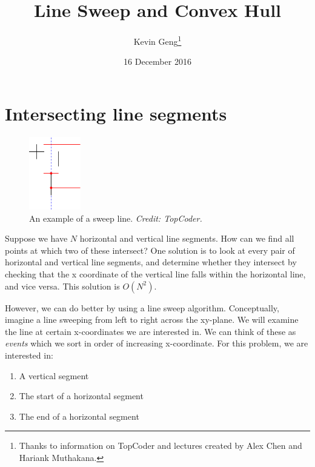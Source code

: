 \documentclass{article}
\title{Line Sweep and Convex Hull}
\author{Kevin Geng\footnote{Thanks to information on TopCoder and lectures created by Alex Chen and Hariank Muthakana.}}
\date{16 December 2016}
\begin{document}
\maketitle


\section{Intersecting line segments}


\begin{figure}
  \vspace{-30pt}
  \begin{center}
    \includegraphics[width=0.20\textwidth]{linesvh.png}
  \end{center}
  \vspace{-10pt}
  \caption{An example of a sweep line. \textit{Credit: TopCoder.}}
  \vspace{-20pt}
\end{figure}

Suppose we have $N$ horizontal and vertical line segments. How can we find all points at which two of these intersect? One solution is to look at every pair of horizontal and vertical line segments, and determine whether they intersect by checking that the x coordinate of the vertical line falls within the horizontal line, and vice versa. This solution is $O(N^2)$.

However, we can do better by using a line sweep algorithm. Conceptually, imagine a line sweeping from left to right across the xy-plane. We will examine the line at certain x-coordinates we are interested in. We can think of these as \textit{events} which we sort in order of increasing x-coordinate. For this problem, we are interested in:

\begin{enumerate}
    \itemsep 0em
    \item A vertical segment
    \item The start of a horizontal segment
    \item The end of a horizontal segment
\end{enumerate}
\end{document}
